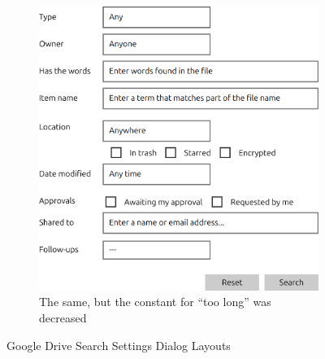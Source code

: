\begin{figure}[t]
\begin{subfigure}[t]{.45\textwidth}
    \end{subfigure}\hspace{1cm}
    \begin{subfigure}[t]{.45\textwidth}
      \centering
      \includegraphics[scale=0.25]{google-drive-search-setting-output3.png}
      \caption{The same, but the constant for ``too long'' was decreased}
    \end{subfigure}
    \caption{Google Drive Search Settings Dialog Layouts}
    \label{fig:QMLtwoGuidelines}
\end{figure}